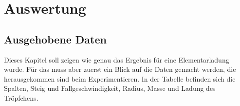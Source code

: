 \chapter{Auswertung}\label{cha:auswertung}
\section{Ausgehobene Daten}\label{sec:aushebungDaten}
Dieses Kapitel soll zeigen wie genau das Ergebnis für eine Elementarladung wurde. Für das muss aber zuerst ein Blick auf die Daten gemacht werden, die herausgekommen sind beim Experimentieren. In der Tabelle befinden sich die Spalten, Steig und Fallgeschwindigkeit, Radius, Masse und Ladung des Tröpfchens. \\

